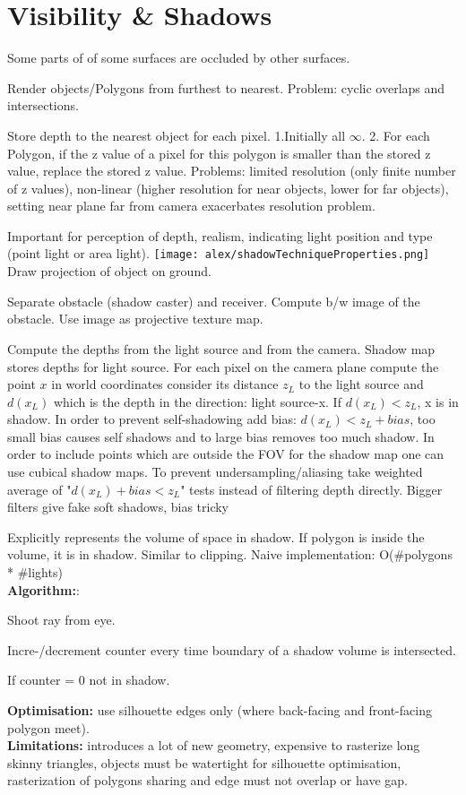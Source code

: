 \section{Visibility \& Shadows}

 Some parts of of some surfaces are occluded by other surfaces.

 Render objects/Polygons from furthest to nearest. Problem: cyclic overlaps and intersections.

 Store depth to the nearest object for each pixel. 1.Initially all $\infty$. 2. For each Polygon, if the z value of a pixel for this polygon is smaller than the stored z value, replace the stored z value. Problems: limited resolution (only finite number of z values), non-linear (higher resolution for near objects, lower for far objects), setting near plane far from camera exacerbates resolution problem.

 Important for perception of depth, realism, indicating light position and type (point light or area light).
\texttt{[image: alex/shadowTechniqueProperties.png]}
 Draw projection of object on ground.

 Separate obstacle (shadow caster) and receiver. Compute b/w image of the obstacle. Use image as projective texture map.

 Compute the depths from the light source and from the camera. Shadow map stores depths for light source. For each pixel on the camera plane compute the point $x$ in world coordinates consider its distance $z_L$ to the light source and $d(x_L)$ which is the depth in the direction: light source-x. If $d(x_L) < z_L$, x is in shadow. In order to prevent self-shadowing add bias: $d(x_L) < z_L + bias$, too small bias causes self shadows and to large bias removes too much shadow. In order to include points which are outside the FOV for the shadow map one can use cubical shadow maps. To prevent undersampling/aliasing take weighted average of "$d(x_L) + bias < z_L$" tests instead of filtering depth directly. Bigger filters give fake soft shadows, bias tricky


 Explicitly represents the volume of space in shadow. If polygon is inside the volume, it is in shadow. Similar to clipping. Naive implementation: O(\#polygons * \#lights)\\
\textbf{Algorithm:}: 
\begin{compactitem}
    \item Shoot ray from eye.
    \item Incre-/decrement counter every time boundary of a shadow volume is intersected.
    \item If counter = 0 not in shadow.
\end{compactitem}
\textbf{Optimisation:} use silhouette edges only (where back-facing and front-facing polygon meet).\\
\textbf{Limitations:} introduces a lot of new geometry, expensive to rasterize long skinny triangles, objects must be watertight for silhouette optimisation, rasterization of polygons sharing and edge must not overlap or have gap.

